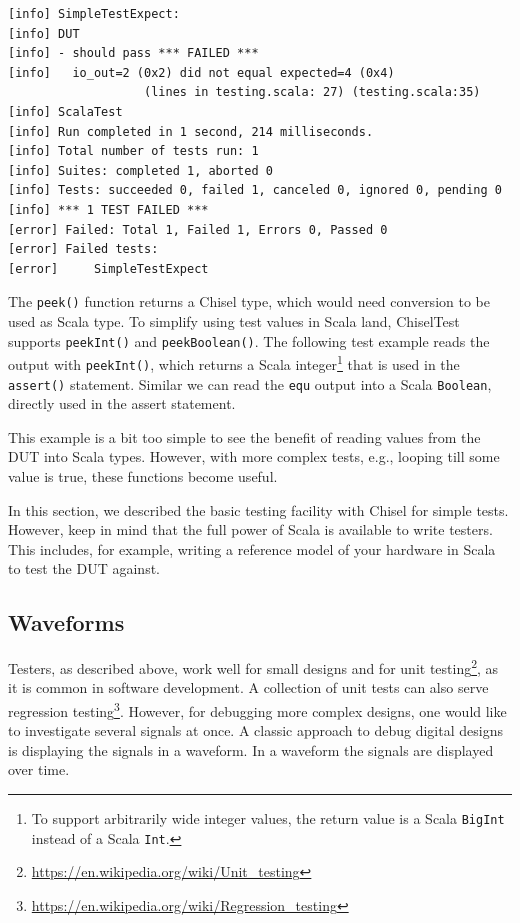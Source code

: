 \documentclass[%
    10pt,
    headinclude, footexclude,
    openright, %
    notitlepage,
    cleardoubleempty,
    headsepline,
    pointlessnumbers,
    bibtotoc, idxtotoc,
    ]{scrbook}
\newcommand{\code}[1]{{\lstinline[basicstyle=\small\ttfamily]{#1}}}
\newcommand{\codefoot}[1]{{\lstinline[basicstyle=\footnotesize\ttfamily]{#1}}}
\newcommand{\myref}[2]{\href{#1}{#2}}
\renewcommand{\myref}[2]{{#2}{\footnote{\url{#1}}}}
\begin{document}
\begin{verbatim}
[info] SimpleTestExpect:
[info] DUT
[info] - should pass *** FAILED ***
[info]   io_out=2 (0x2) did not equal expected=4 (0x4)
                   (lines in testing.scala: 27) (testing.scala:35)
[info] ScalaTest
[info] Run completed in 1 second, 214 milliseconds.
[info] Total number of tests run: 1
[info] Suites: completed 1, aborted 0
[info] Tests: succeeded 0, failed 1, canceled 0, ignored 0, pending 0
[info] *** 1 TEST FAILED ***
[error] Failed: Total 1, Failed 1, Errors 0, Passed 0
[error] Failed tests:
[error] 	SimpleTestExpect
\end{verbatim}

The \code{peek()} function returns a Chisel type, which would need conversion to be used
as Scala type. To simplify using test values in Scala land, ChiselTest supports \code{peekInt()}
and \code{peekBoolean()}. The following test example reads the output with \code{peekInt()},
which returns a Scala integer\footnote{To support arbitrarily wide integer values, the
return value is a Scala \codefoot{BigInt} instead of a Scala \codefoot{Int}.}
that is used in the \code{assert()} statement.
Similar we can read the \code{equ} output into a Scala \code{Boolean}, directly
used in the assert statement.


This example is a bit too simple to see the benefit of reading values from the DUT
into Scala types. However, with more complex tests, e.g., looping till some value is true,
these functions become useful.

In this section, we described the basic testing facility with Chisel for simple tests.
However, keep in mind that the full power of Scala is available to write testers.
This includes, for example, writing a reference model of your hardware in Scala to
test the DUT against.

\subsection{Waveforms}



Testers, as described above, work well for small designs and for
\myref{https://en.wikipedia.org/wiki/Unit_testing}{unit testing}, as it is common in
software development. A collection of unit tests can also serve
\myref{https://en.wikipedia.org/wiki/Regression_testing}{regression testing}. However, 
for debugging more complex designs, one would like to investigate several signals at 
once. A classic approach to debug digital designs is displaying the signals in a 
waveform. In a waveform the signals are displayed over time.
\end{document}
